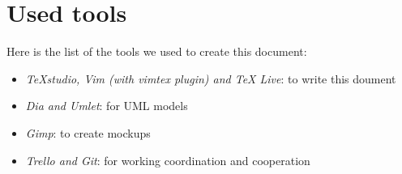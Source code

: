 \section{Used tools}
Here is the list of the tools we used to create this document:

\newcommand{\tool}[2]{
	\item 
	\textit{ #1}: #2	
}


\begin{itemize}
	\tool {TeXstudio, Vim (with vimtex plugin) and TeX Live}{to write this doument}
	\tool {Dia and Umlet}{for UML models}
	\tool {Gimp}{to create mockups}
	\tool {Trello and Git}{for working coordination and cooperation}
\end{itemize}
